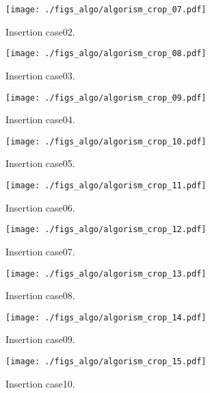 \begin{figure}[h]
  \texttt{[image: ./figs\_algo/algorism\_crop\_07.pdf]}
  \caption{ Insertion case02. }
  \label{fig_IpCHashT_insert_hard_case02}
\end{figure}

\begin{figure}[h]
  \texttt{[image: ./figs\_algo/algorism\_crop\_08.pdf]}
  \caption{ Insertion case03. }
  \label{fig_IpCHashT_insert_hard_case03}
\end{figure}

\begin{figure}[h]
  \texttt{[image: ./figs\_algo/algorism\_crop\_09.pdf]}
  \caption{ Insertion case04. }
  \label{fig_IpCHashT_insert_hard_case04}
\end{figure}

\begin{figure}[h]
  \texttt{[image: ./figs\_algo/algorism\_crop\_10.pdf]}
  \caption{ Insertion case05. }
  \label{fig_IpCHashT_insert_hard_case05}
\end{figure}

\begin{figure}[h]
  \texttt{[image: ./figs\_algo/algorism\_crop\_11.pdf]}
  \caption{ Insertion case06. }
  \label{fig_IpCHashT_insert_hard_case06}
\end{figure}

\begin{figure}[h]
  \texttt{[image: ./figs\_algo/algorism\_crop\_12.pdf]}
  \caption{ Insertion case07. }
  \label{fig_IpCHashT_insert_hard_case07}
\end{figure}

\begin{figure}[h]
  \texttt{[image: ./figs\_algo/algorism\_crop\_13.pdf]}
  \caption{ Insertion case08. }
  \label{fig_IpCHashT_insert_hard_case08}
\end{figure}

\begin{figure}[h]
  \texttt{[image: ./figs\_algo/algorism\_crop\_14.pdf]}
  \caption{ Insertion case09. }
  \label{fig_IpCHashT_insert_hard_case09}
\end{figure}

\begin{figure}[h]
  \texttt{[image: ./figs\_algo/algorism\_crop\_15.pdf]}
  \caption{ Insertion case10. }
  \label{fig_IpCHashT_insert_hard_case10}
\end{figure}

